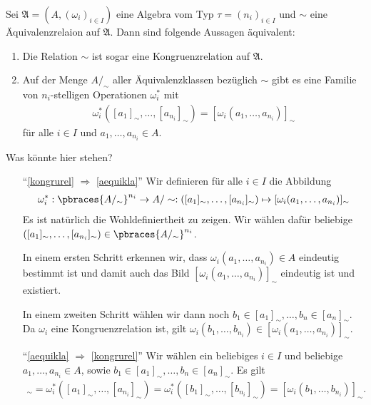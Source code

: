 \begin{exercise}
    Sei $\mathfrak{A} = (A, (\omega_i)_{i \in I})$ eine Algebra vom Typ $\tau = (n_i)_{i \in I}$ und $\sim$ eine Äquivalenzrelaion auf $\mathfrak{A}$. Dann sind folgende Aussagen äquivalent:
    \begin{enumerate}[label = (\roman*)]
        \item \label{kongrurel} Die Relation $\sim$ ist sogar eine Kongruenzrelation auf $\mathfrak{A}$.
        \item \label{aequikla} Auf der Menge $A/_\sim$ aller Äquivalenzklassen bezüglich $\sim$ gibt es eine Familie von $n_i$-stelligen Operationen $\omega_i^*$ mit 
        \begin{align*}
            \omega_i^*([a_1]_\sim, \dots, [a_{n_i}]_\sim) = [\omega_i(a_1, \dots, a_{n_i})]_\sim
        \end{align*}
        für alle $i \in I$ und $a_1, \dots, a_{n_i} \in A$. 
    \end{enumerate}
\end{exercise}

\begin{solution}
    Was könnte hier stehen?
    \begin{enumerate}
        \item[``\ref{kongrurel} $\Rightarrow$ \ref{aequikla}''] Wir definieren für alle $i \in I$ die Abbildung
        \begin{align*}
            \omega_i^*: \pbraces{A/_\sim}^{n_i} \to A/\sim: ([a_1]_\sim, \dots, [a_{n_i}]_\sim) \mapsto [\omega_i(a_1, \dots, a_{n_i})]_\sim
        \end{align*} 
        Es ist natürlich die Wohldefiniertheit zu zeigen. Wir wählen dafür beliebige $([a_1]_\sim, \dots, [a_{n_i}]_\sim) \in \pbraces{A/_\sim}^{n_i}$. 
        
        In einem ersten Schritt erkennen wir, dass $\omega_i(a_1, \dots, a_{n_i}) \in A$ eindeutig bestimmt ist und damit auch das Bild $[\omega_i(a_1, \dots, a_{n_i})]_\sim$ eindeutig ist und existiert.
        
        In einem zweiten Schritt wählen wir dann noch $b_1 \in [a_1]_\sim ,\dots, b_n \in [a_n]_\sim$. Da $\omega_i$ eine Kongruenzrelation ist, gilt $\omega_i(b_1, \dots, b_{n_i}) \in [\omega_i(a_1, \dots, a_{n_i})]_\sim$. 

        \item[``\ref{aequikla} $\Rightarrow$ \ref{kongrurel}''] Wir wählen ein beliebiges $i \in I$ und beliebige $a_1, \dots, a_{n_i} \in A$, sowie $b_1 \in [a_1]_\sim ,\dots, b_n \in [a_n]_\sim$. Es gilt
        \begin{align*}
            [\omega_i(a_1, \dots, a_{n_i})]_\sim = \omega_i^*([a_1]_\sim, \dots, [a_{n_i}]_\sim) = \omega_i^*([b_1]_\sim, \dots, [b_{n_i}]_\sim) = [\omega_i(b_1, \dots, b_{n_i})]_\sim.
        \end{align*} 
    \end{enumerate}
\end{solution}